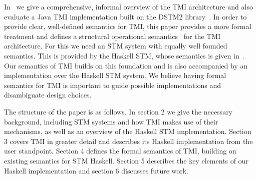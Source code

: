 In~\cite{tmi} we give a comprehensive, informal overview of the TMI architecture and also evaluate 
a Java TMI implementation built on the DSTM2 library~\cite{hlm06}.
In order to provide clear, well-defined semantics for TMI, this paper provides a more
formal treatment and defines a structural operational semantics~\cite{plotkin_04_structural} 
for the TMI architecture.
For this we need an STM system with equally well founded semantics. This is provided by the Haskell
STM, whose semantics is given in~\cite{haskellstm}. Our semantics of TMI builds on this foundation
and is also accompanied by an implementation over the Haskell STM system. We believe having formal
semantics for TMI is important to guide possible implementations and disambiguate design choices.

The structure of the paper is as follows. In section 2 we give the necessary background, including
STM systems and how TMI makes use of their mechanisms, as well as an overview of the Haskell STM
implementation. Section 3 covers TMI in greater detail and describes its Haskell implementation
from the user standpoint. Section 4 defines the formal semantics of TMI, building on existing
semantics for STM Haskell. Section 5 describes the key elements of our Haskell implementation
and section 6 discusses future work.

